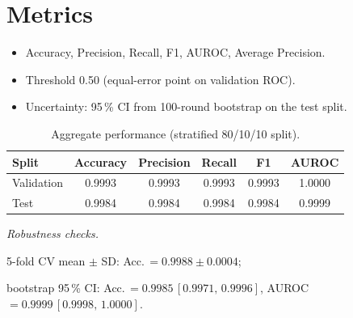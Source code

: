 \documentclass[11pt]{article}
\begin{document}
  


\section{Metrics}

\begin{itemize}[leftmargin=*, label=--]

\item Accuracy, Precision, Recall, F1, AUROC, Average Precision.

\item Threshold 0.50 (equal-error point on validation ROC).

\item Uncertainty: 95\,\% CI from 100-round bootstrap on the test split.

\end{itemize}

  

\begin{table}[H]

\centering

\caption{Aggregate performance (stratified 80/10/10 split).}

\begin{tabular}{lccccc}

\toprule

Split & Accuracy & Precision & Recall & F1 & AUROC \\

\midrule

Validation & 0.9993 & 0.9993 & 0.9993 & 0.9993 & 1.0000 \\

Test & 0.9984 & 0.9984 & 0.9984 & 0.9984 & 0.9999 \\

\bottomrule

\end{tabular}

\end{table}

  

\textit{Robustness checks.}

5-fold CV mean $\pm$ SD: Acc.\,$=0.9988 \pm 0.0004$;

bootstrap 95\,\% CI: Acc.\,$=0.9985\,[0.9971,\,0.9996]$, AUROC\,$=0.9999\,[0.9998,\,1.0000]$.

  
\end{document}
